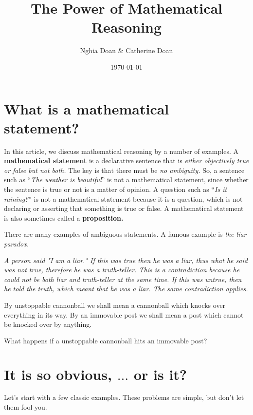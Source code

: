 \documentclass{article}
\title{The Power of Mathematical Reasoning}
\author{Nghia Doan \& Catherine Doan}
\date{\today}
\begin{document}
\maketitle

\section*{What is a mathematical statement?}

In this article, we discuss mathematical reasoning by a number of examples.
A \textbf{mathematical statement} is a declarative sentence that is \textit{either objectively true or false but not both.}
The key is that there must be \textit{no ambiguity.}
So, a sentence such as “\textit{The weather is beautiful}” is not a mathematical statement, since
whether the sentence is true or not is a matter of opinion.
A question such as “\textit{Is it raining?}” is not a mathematical statement
because it is a question, which is not declaring or asserting that something is true or false.
A mathematical statement is also sometimes called a \textbf{proposition.}

\begin{remark*}
    There are many examples of ambiguous statements. A famous example is \textit{the liar paradox.}
    
    \textit{A person said "I am a liar."
    If this was true then he was a liar, thus what he said was not true, therefore he was a truth-teller.
    This is a contradiction because he could not be both liar and truth-teller at the same time.
    If this was untrue, then he told the truth, which meant that he was a liar. The same contradiction applies.}
\end{remark*}

\begin{exercise*}
    \label{exercise:pi-2022-4-p0}
    By unstoppable cannonball we shall mean a cannonball which knocks over everything in its way.
    By an immovable post we shall mean a post which cannot be knocked over by anything.
    
    What happens if a unstoppable cannonball hits an immovable post?
\end{exercise*}

\section*{It is so obvious, $\ldots$ or is it?}

Let's start with a few classic examples.
These problems are simple, but don't let them fool you.
\end{document}
